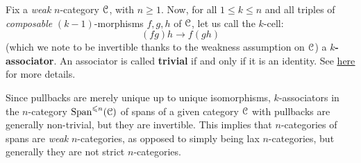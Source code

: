             \begin{convention}[Associators]
                Fix a \textit{weak} $n$-category $\mathcal{C}$, with $n \geq 1$. Now, for all $1 \leq k \leq n$ and all triples of \textit{composable} $(k - 1)$-morphisms $f, g, h$ of $\mathcal{C}$, let us call the $k$-cell:
                    $$(fg)h \to f(gh)$$
                (which we note to be invertible thanks to the weakness assumption on $\mathcal{C}$) a \textbf{$k$-associator}. An associator is called \textbf{trivial} if and only if it is an identity. See \href{https://ncatlab.org/nlab/show/associator}{\underline{here}} for more details. 
            \end{convention}
            \begin{remark}
                Since pullbacks are merely unique up to unique isomorphisms, $k$-associators in the $n$-category $\mathrm{Span}^{\leqslant n}(\mathcal{C})$ of spans of a given category $\mathcal{C}$ with pullbacks are generally non-trivial, but they are invertible. This implies that $n$-categories of spans are \textit{weak} $n$-categories, as opposed to simply being lax $n$-categories, but generally they are not strict $n$-categories. 
            \end{remark}
            
            \begin{proposition}
                
            \end{proposition}
        
